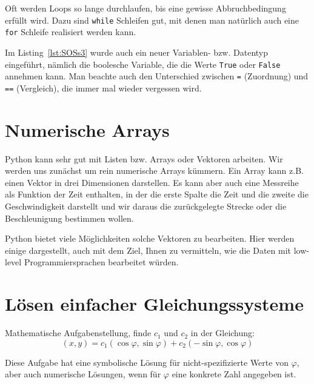 Oft werden Loops so lange durchlaufen, bis eine gewisse Abbruchbedingung erfüllt wird. 
%
Dazu sind \texttt{while} Schleifen gut, mit denen man natürlich auch eine \texttt{for} Schleife realisiert werden kann.




Im Listing~\ref{lst:SOSs3} wurde auch ein neuer Variablen- bzw. Datentyp eingeführt, nämlich die boolesche Variable, die die Werte \texttt{True} oder \texttt{False} annehmen kann. 
%
Man beachte auch den Unterschied zwischen \texttt{=} (Zuordnung) und \texttt{==} (Vergleich), die immer mal wieder vergessen wird. 
%



\section{Numerische Arrays}

Python kann sehr gut mit Listen bzw. Arrays oder Vektoren arbeiten.
%
Wir werden uns zunächst um rein numerische Arrays kümmern.
%
Ein Array kann z.B. einen Vektor in drei Dimensionen darstellen.
%
Es kann aber auch eine Messreihe als Funktion der Zeit enthalten, in der die erste Spalte die Zeit und die zweite die Geschwindigkeit darstellt und wir daraus die zurückgelegte Strecke oder die Beschleunigung bestimmen wollen. 
%

Python bietet viele Möglichkeiten solche Vektoren zu bearbeiten.
%
Hier werden einige dargestellt, auch mit dem Ziel, Ihnen zu vermitteln, wie die Daten mit low-level Programmiersprachen bearbeitet würden.

\section{Lösen einfacher Gleichungssysteme}

Mathematische Aufgabenstellung, finde $c_1$ und $c_2$ in der Gleichung:
$$ \left( x , y\right) = c_1 \left(\cos\varphi, \sin\varphi\right) + c_2 \left(-\sin\varphi, \cos\varphi\right) $$

Diese Aufgabe hat eine symbolische Lösung für nicht-spezifizierte Werte von $\varphi$, aber auch numerische Lösungen, wenn für $\varphi$ eine konkrete Zahl angegeben ist. 

